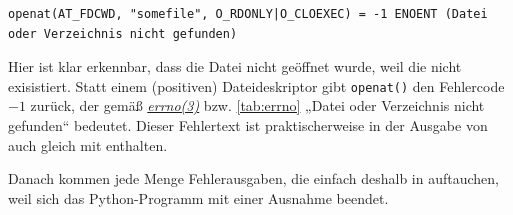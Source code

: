 \begin{lstlisting}
openat(AT_FDCWD, "somefile", O_RDONLY|O_CLOEXEC) = -1 ENOENT (Datei oder Verzeichnis nicht gefunden)
\end{lstlisting}

Hier ist klar erkennbar, dass die Datei nicht geöffnet wurde, weil die nicht exisistiert. Statt
einem (positiven) Dateideskriptor gibt \texttt{openat()} den Fehlercode $-1$ zurück, der gemäß
\href{http://man7.org/linux/man-pages/man3/errno.3.html}{\emph{errno(3)}} bzw. \autoref{tab:errno} 
„Datei oder Verzeichnis nicht gefunden“ bedeutet. Dieser Fehlertext ist praktischerweise in der
Ausgabe von \strace{} auch gleich mit enthalten.

Danach kommen jede Menge Fehlerausgaben, die einfach deshalb in \strace{} auftauchen, weil sich das
Python-Programm mit einer Ausnahme beendet.


